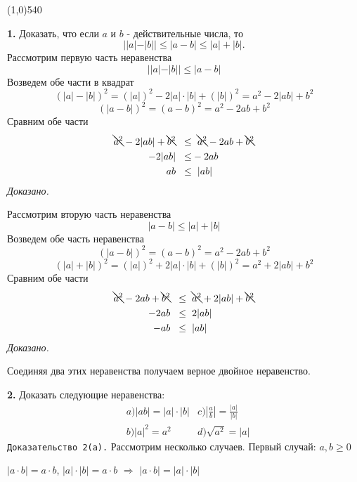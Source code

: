 \documentclass[12pt]{article}
\begin{document}
\hspace{2mm}\line(1,0){540}

{\bf 1.} Доказать, что если $a$ и $b$ - действительные числа, то
\[\label{task1}
	||a|-|b||\le|a-b|\le|a|+|b|.
\]
 Рассмотрим первую часть неравенства
\[
	||a|-|b||\le|a-b|
\]
Возведем обе части в квадрат
\[
	(|a|-|b|)^2 = (|a|)^2-2|a|\cdot|b|+(|b|)^2 = a^2-2|ab|+b^2
\]
\[
	(|a-b|)^2 = (a-b)^2 = a^2-2ab+b^2
\]
Сравним обе части 
\begin{align*}
	\bcancel{a^2}-2|ab|+\bcancel{b^2}\hspace{2mm} \le&\hspace{2mm} \bcancel{a^2}-2ab+\bcancel{b^2} \\
	-2|ab|\hspace{2mm}\le& -2ab \\
	ab\hspace{2mm}\le& \hspace{2mm}|ab|
\end{align*}
{\it Доказано.}
\medskip

Рассмотрим вторую часть неравенства
\[
	|a-b|\le |a|+|b|
\]
Возведем обе часть неравенства
\[
	(|a-b|)^2 = (a-b)^2 = a^2-2ab+b^2
\]
\[
	(|a|+|b|)^2 = (|a|)^2+2|a|\cdot|b|+(|b|)^2 = a^2+2|ab|+b^2
\]
Сравним обе части 
\begin{align*}
	\bcancel{a^2}-2ab+\bcancel{b^2} \hspace{2mm}\le&\hspace{2mm} \bcancel{a^2}+2|ab|+\bcancel{b^2} \\
	-2ab\hspace{2mm}\le&\hspace{2mm}2|ab| \\
	-ab\hspace{2mm}\le&\hspace{2mm} |ab|
\end{align*}
{\it Доказано.}

	
 Соединяя два этих неравенства получаем верное двойное неравенство.
	
{\bf 2.} Доказать следующие неравенства:
\begin{align*}
	&a) |ab| = |a|\cdot|b| &c) \left|\frac{a}{b}\right| = \frac{|a|}{|b|}\\
	&b)|a|^2 = a^2 &d)\sqrt{a^2} = |a|
\end{align*}
{\tt Доказательство 2(a).} Рассмотрим несколько случаев. Первый случай: $a,b\ge 0$\vspace{1mm}

$|a\cdot b| = a\cdot b$, \quad $|a|\cdot|b| = a\cdot b$ $\Longrightarrow$ $|a\cdot b| = |a|\cdot|b|$
\end{document}
